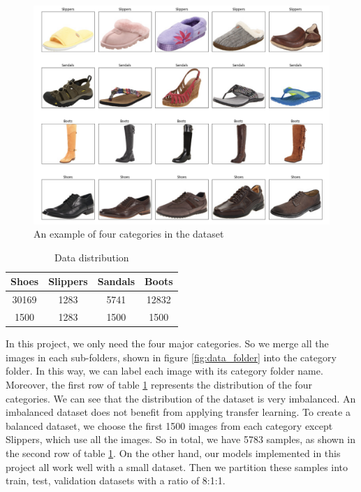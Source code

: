 \begin{figure}[h]
	\includegraphics[width=\linewidth]{figs/data_example.png}
	\caption{An example of four categories in the dataset }
	\label{fig:data_example}
\end{figure}

\begin{table}[ht]
    \caption{Data distribution} 
    \centering 
    \begin{tabular}{c c c c} 
    \hline\hline 
    Shoes & Slippers & Sandals & Boots  \\%
    \hline %
    30169 & 1283 & 5741 & 12832 \\%
    1500 & 1283 & 1500 & 1500 \\%
    \hline 
    \end{tabular}
\label{table:data} %
\end{table}

In this project, we only need the four major categories. So we merge all the images in each sub-folders, shown in figure \ref{fig:data_folder} into the category folder. In this way, we can label each image with its category folder name. Moreover, the first row of table \ref{table:data} represents the distribution of the four categories. We can see that the distribution of the dataset is very imbalanced. An imbalanced dataset does not benefit from applying transfer learning. To create a balanced dataset, we choose the first 1500 images from each category except Slippers, which use all the images. So in total, we have 5783 samples, as shown in the second row of table \ref{table:data}. On the other hand, our models implemented in this project all work well with a small dataset. Then we partition these samples into train, test, validation datasets with a ratio of 8:1:1. 

